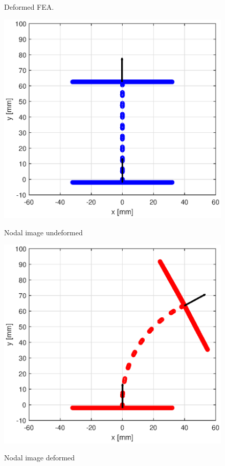\begin{figure}[H]
\begin{minipage}[b]{0.5\linewidth}
    \caption{Deformed FEA.} 
    \vspace{4ex}
    \label{fig3:FEMdef} 
  \end{minipage} 
  \begin{minipage}[b]{0.5\linewidth}
    \centering
    \includegraphics[width=\linewidth]{Figures/Chapter2/undeformednodal.eps} 
    \caption{Nodal image undeformed} 
    \vspace{4ex}
    \label{fig3:MATun} 
  \end{minipage}%
  \begin{minipage}[b]{0.5\linewidth}
    \centering
    \includegraphics[width=\linewidth]{Figures/Chapter2/deformednodal.eps} 
    \caption{Nodal image deformed } 
    \vspace{4ex}
    \label{fig3:MATdef} 
  \end{minipage} 
\end{figure}



